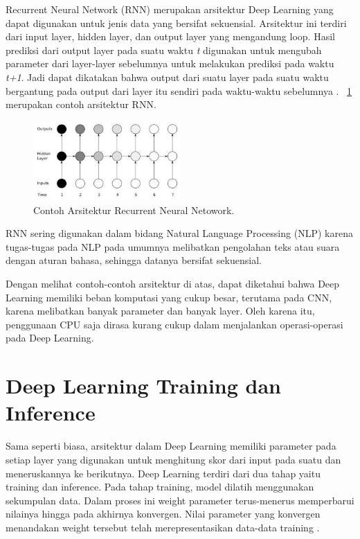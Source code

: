 Recurrent Neural Network (RNN) merupakan arsitektur Deep Learning yang dapat digunakan untuk jenis data yang bersifat sekuensial. Arsitektur ini terdiri dari input layer, hidden layer, dan output layer yang mengandung loop. Hasil prediksi dari output layer pada suatu waktu \textit{t} digunakan untuk mengubah parameter dari layer-layer sebelumnya untuk melakukan prediksi pada waktu \textit{t+1}. Jadi dapat dikatakan bahwa output dari suatu layer pada suatu waktu bergantung pada output dari layer itu sendiri pada waktu-waktu sebelumnya \cite{deeplearning2}. \pic~\ref{fig:rnn} merupakan contoh arsitektur RNN.

\begin{figure}
	\centering
	\includegraphics[width=0.50\textwidth]
	{pics/rnn.jpeg}
	\caption{Contoh Arsitektur Recurrent Neural Netowork.}
	\label{fig:rnn}
\end{figure}

RNN sering digunakan dalam bidang Natural Language Processing (NLP) karena tugas-tugas pada NLP pada umumnya melibatkan  pengolahan teks atau suara dengan aturan bahasa, sehingga datanya bersifat sekuensial. 

Dengan melihat contoh-contoh arsitektur \deeplearning di atas, dapat diketahui bahwa Deep Learning memiliki beban komputasi yang cukup besar, terutama pada CNN, karena melibatkan banyak parameter dan banyak layer. Oleh karena itu, penggunaan CPU saja dirasa kurang cukup dalam menjalankan operasi-operasi pada Deep Learning.
\section{Deep Learning Training dan Inference}
Sama seperti \nn biasa, arsitektur \nn dalam Deep Learning memiliki parameter \weight pada setiap layer yang digunakan untuk menghitung skor dari input pada suatu \layer dan meneruskannya ke \layer berikutnya. Deep Learning terdiri dari dua  tahap yaitu training dan inference. Pada tahap training, model \nn dilatih menggunakan sekumpulan data. Dalam proses ini weight parameter terus-menerus memperbarui nilainya hingga pada akhirnya konvergen. Nilai parameter yang konvergen menandakan weight tersebut telah merepresentasikan data-data training \cite{deeplearningmatrix}.

